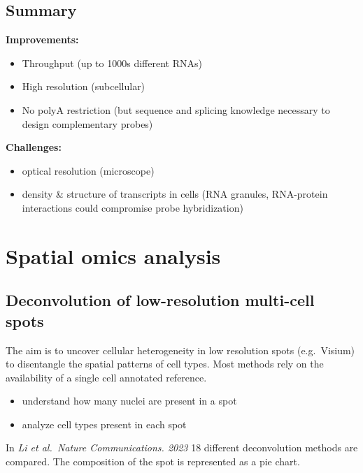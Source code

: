 \hypertarget{summary}{%
\subsection{Summary}\label{summary}}

\textbf{Improvements:}

\begin{itemize}
\tightlist
\item
  Throughput (up to 1000s different RNAs)
\item
  High resolution (subcellular)
\item
  No polyA restriction (but sequence and splicing knowledge necessary to
  design complementary probes)
\end{itemize}

\textbf{Challenges:}

\begin{itemize}
\tightlist
\item
  optical resolution (microscope)
\item
  density \& structure of transcripts in cells (RNA granules,
  RNA-protein interactions could compromise probe hybridization)
\end{itemize}

\hypertarget{spatial-omics-analysis}{%
\section{Spatial omics analysis}\label{spatial-omics-analysis}}

\hypertarget{deconvolution-of-low-resolution-multi-cell-spots}{%
\subsection{Deconvolution of low-resolution multi-cell
spots}\label{deconvolution-of-low-resolution-multi-cell-spots}}

The aim is to uncover cellular heterogeneity in low resolution spots
(e.g.~Visium) to disentangle the spatial patterns of cell types. Most
methods rely on the availability of a single cell annotated reference.

\begin{itemize}
\tightlist
\item
  understand how many nuclei are present in a spot
\item
  analyze cell types present in each spot
\end{itemize}

In \emph{Li et al.~Nature Communications. 2023} 18 different
deconvolution methods are compared. The composition of the spot is
represented as a pie chart.

